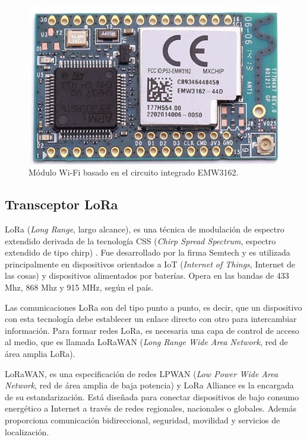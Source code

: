 \begin{figure}[h]
	\centering
	\includegraphics[scale=0.25]{./Figures/wifi_module.jpg}
	\caption{Módulo Wi-Fi basado en el circuito integrado EMW3162\protect\footnotemark.}
	\label{fig:cuadradoAzul}
\end{figure}


\subsection{Transceptor LoRa}

LoRa (\textit{Long Range}, largo alcance), es una técnica de modulación de espectro extendido derivada de la tecnología CSS (\textit{Chirp Spread Spectrum}, espectro extendido de tipo chirp) \citep{WEBSITE:9}. Fue desarrollado por la firma Semtech y es utilizada principalmente en dispositivos orientados a IoT (\textit{Internet of Things}, Internet de las cosas) y dispositivos alimentados por baterías. Opera en las bandas de 433 Mhz, 868 Mhz y 915 MHz, según el país.

Las comunicaciones LoRa son del tipo punto a punto, es decir, que un dispositivo con esta tecnología debe establecer un enlace directo con otro para intercambiar información. Para formar redes LoRa, es necesaria una capa de control de acceso al medio, que es llamada LoRaWAN (\textit{Long Range Wide Area Network}, red de área amplia LoRa).

LoRaWAN, es una especificación de redes LPWAN (\textit{Low Power Wide Area Network}, red de área amplia de baja potencia) y LoRa Alliance es la encargada de su estandarización. Está diseñada para conectar dispositivos de bajo consumo energético a Internet a través de redes regionales, nacionales o globales. Además proporciona comunicación bidireccional, seguridad, movilidad y servicios de localización\citep{WEBSITE:10}.

